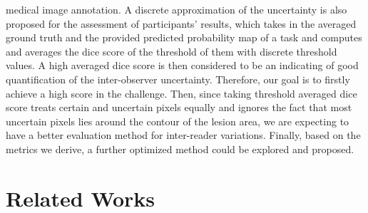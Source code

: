 \documentclass[12pt]{extarticle}
\begin{document}
medical image annotation. A discrete approximation of the uncertainty is also
proposed for the assessment of participants' results, which
takes in the averaged ground truth and the provided predicted probability map of a task
and computes and averages the dice score of the threshold of them with
discrete threshold values\cite{qubiq}. A high averaged dice score is then considered to 
be an indicating of good quantification of the inter-observer uncertainty.
Therefore, our goal is to firstly achieve a high score in the challenge. 
Then, since taking threshold averaged dice score treats certain and uncertain pixels equally 
and ignores the fact that most uncertain pixels lies around 
the contour of the lesion area, we are expecting to have a
better evaluation method for inter-reader variations. 
Finally, based on the metrics we derive, a further
optimized method could be explored and proposed.
\section{Related Works}
\end{document}
